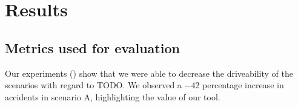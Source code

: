 \chapter{Results}\label{sec:results}

\section{Metrics used for evaluation}

Our experiments () show that we were able to decrease the driveability of the
scenarios with regard to TODO. We observed a \num{-42} percentage increase in accidents in scenario
A, highlighting the value of our tool.